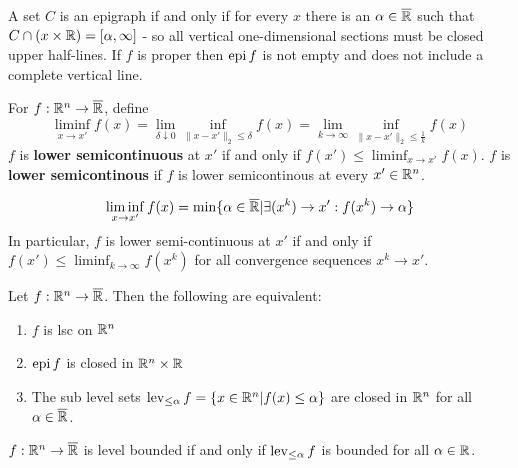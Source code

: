 \begin{thm}
  \label{sec:existence-4}
  A set $C$ is an epigraph if and only if for every $x$ there is an
  $\alpha \in \overline {\mathbb{R}}$ such that $C \cap (x \times \mathbb{R}) = [\alpha,
  \infty]$ - so all vertical one-dimensional sections must be closed
  upper half-lines. If $f$ is proper then $\operatorname*{epi} f $ is not empty and
  does not include a complete vertical line.
\end{thm}

\begin{defn}
  \label{sec:existence-5}
  For $f: \mathbb{R}^{n} \rightarrow \overline {\mathbb{R}}$, define
  \begin{equation}
    \label{eq:3}
    \liminf_{x \rightarrow x'} f(x) = \lim_{\delta \downarrow 0}
    \inf_{\| x - x'\|_{2} \leq \delta} f(x) = \lim_{k \rightarrow
      \infty} \inf_{\| x - x'\|_{2} \leq \frac{1}{k}} f(x)
  \end{equation}
  $f$ is \textbf{lower semicontinuous} at $x'$ if and only if $f(x')
  \leq \liminf_{x \rightarrow x'} f(x)$.
  $f$ is \textbf{lower semicontinous} if $f$ is lower semicontinous at
  every $x' \in \mathbb{R}^{n}$.
\end{defn}

\begin{thm}
  \label{sec:existence-7}
  \begin{equation}
    \label{eq:4}
    \liminf_{x \rightarrow x'} f(x) = \min \{ \alpha \in \overline {\mathbb{R}}
    | \exists (x^{k}) \rightarrow x' : f(x^{k}) \rightarrow \alpha \}
  \end{equation}
  In particular, $f$ is lower semi-continuous at $x'$ if and only if
  $f(x') \leq \liminf_{k \rightarrow \infty} f(x^{k})$ for all
  convergence sequences $x^{k} \rightarrow x'$.
\end{thm}

\begin{thm}
  \label{sec:existence-8}
  Let $f: \mathbb{R}^{n} \rightarrow \overline {\mathbb{R}}$.  Then the following are
  equivalent:
  \begin{enumerate}
  \item $f$ is lsc on $\mathbb{R}^{n}$
  \item $\operatorname*{epi} f$ is closed in $\mathbb{R}^{n} \times \mathbb{R}$
  \item The sub level sets $\operatorname*{lev}_{\leq \alpha} f = \{ x \in \mathbb{R}^{n} |
    f(x) \leq \alpha \} $ are closed in $\mathbb{R}^{n}$ for all $\alpha \in
    \overline {\mathbb{R}}$.
  \end{enumerate}
\end{thm}

\begin{defn}
  \label{sec:existence-9}
  $f: \mathbb{R}^{n} \rightarrow \overline {\mathbb{R}}$ is level bounded if and only if
  $\operatorname*{lev}_{\leq \alpha} f$ is bounded for all $\alpha \in \mathbb{R}$.
\end{defn}

